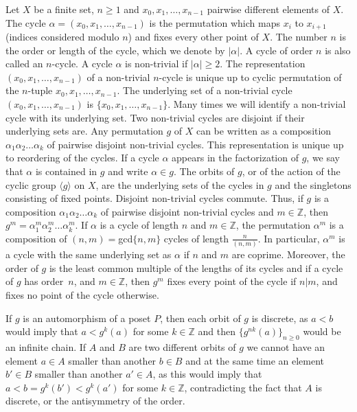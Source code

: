 \documentclass[10pt,a4paper]{amsart}
\newcommand{\Z}{\mathbb{Z}}
\theoremstyle{plain}
\theoremstyle{definition}
\theoremstyle{remark}
\begin{document}
Let $X$ be a finite set, $n\ge 1$ and $x_0,x_1,\ldots, x_{n-1}$ pairwise different elements of $X$. The cycle $\alpha =(x_0,x_1,\ldots , x_{n-1})$ is the permutation which maps $x_i$ to $x_{i+1}$ (indices considered modulo $n$) and fixes every other point of $X$. The number $n$ is the order or length of the cycle, which we denote by $|\alpha|$. A cycle of order $n$ is also called an $n$-cycle. A cycle $\alpha$ is non-trivial if $|\alpha|\ge 2$. The representation $(x_0,x_1,\ldots, x_{n-1})$ of a non-trivial $n$-cycle is unique up to cyclic permutation of the $n$-tuple $x_0,x_1,\ldots,x_{n-1}$. The underlying set of a non-trivial cycle $(x_0,x_1,\ldots , x_{n-1})$ is $\{x_0,x_1,\ldots , x_{n-1}\}$. Many times we will identify a non-trivial cycle with its underlying set. Two non-trivial cycles are disjoint if their underlying sets are. Any permutation $g$ of $X$ can be written as a composition $\alpha_1 \alpha_2 \ldots \alpha_k$ of pairwise disjoint non-trivial cycles. This representation is unique up to reordering of the cycles.
If a cycle $\alpha$ appears in the factorization of $g$, we say that $\alpha$ is contained in $g$ and write $\alpha \in g$. The orbits of $g$, or of the action of the cyclic group $\langle g \rangle$ on $X$, are the underlying sets of the cycles in $g$ and the singletons consisting of fixed points. Disjoint non-trivial cycles commute. Thus, if $g$ is a composition $\alpha_1 \alpha_2 \ldots \alpha_k$ of pairwise disjoint non-trivial cycles and $m\in \Z$, then $g^m=\alpha_1^m \alpha_2^m \ldots \alpha_k^m$. If $\alpha$ is a cycle of length $n$ and $m\in \Z$, the permutation $\alpha^m$ is a composition of $(n,m)=$gcd$\{n,m\}$ cycles of length $\frac{n}{(n,m)}$. In particular, $\alpha^m$ is a cycle with the same underlying set as $\alpha$ if $n$ and $m$ are coprime. Moreover, the order of $g$ is the least common multiple of the lengths of its cycles and if a cycle of $g$ has order~$n$, and $m\in \Z$, then $g^m$ fixes every point of the cycle if $n|m$, and fixes no point of the cycle otherwise. 


If $g$ is an automorphism of a poset $P$, then each orbit of $g$ is discrete, as $a<b$ would imply that $a<g^k(a)$ for some $k\in \Z$ and then $\{g^{nk}(a)\}_{n\ge 0}$ would be an infinite chain. If $A$ and $B$ are two different orbits of $g$ we cannot have an element $a\in A$ smaller than another $b\in B$ and at the same time an element $b'\in B$ smaller than another $a'\in A$, as this would imply that $a<b=g^k(b')<g^k(a')$ for some $k\in \Z$, contradicting the fact that $A$ is discrete, or the antisymmetry of the order.
\end{document}
